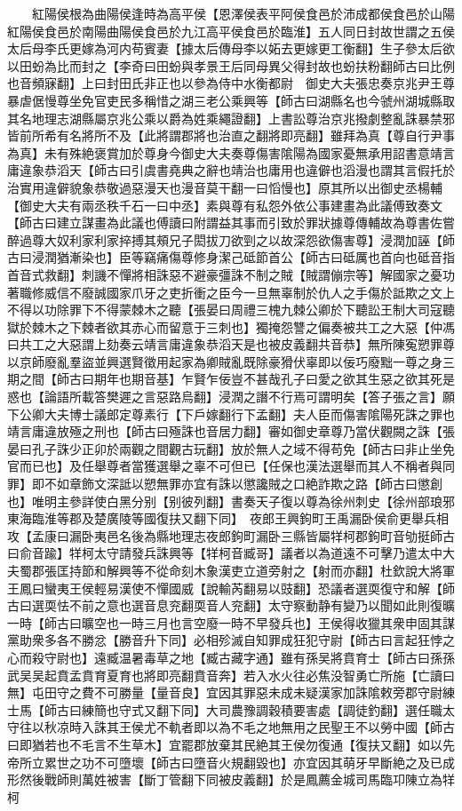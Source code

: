 　　紅陽侯根為曲陽侯逢時為高平侯【恩澤侯表平阿侯食邑於沛成都侯食邑於山陽紅陽侯食邑於南陽曲陽侯食邑於九江高平侯食邑於臨淮】五人同日封故世謂之五侯太后母李氏更嫁為河内苟賓妻【據太后傳母李以妬去更嫁更工衡翻】生子參太后欲以田蚡為比而封之【李奇曰田蚡與孝景王后同母異父得封故也蚡扶粉翻師古曰比例也音頻寐翻】上曰封田氏非正也以參為侍中水衡都尉　御史大夫張忠奏京兆尹王尊暴虐倨慢尊坐免官吏民多稱惜之湖三老公乘興等【師古曰湖縣名也今虢州湖城縣取其名地理志湖縣屬京兆公乘以爵為姓乘繩證翻】上書訟尊治京兆撥劇整亂誅暴禁邪皆前所希有名將所不及【此將謂郡將也治直之翻將即亮翻】雖拜為真【尊自行尹事為真】未有殊絶褒賞加於尊身今御史大夫奏尊傷害隂陽為國家憂無承用詔書意靖言庸違象恭滔天【師古曰引虞書堯典之辭也靖治也庸用也違僻也滔漫也謂其言假托於治實用違僻貌象恭敬過惡漫天也漫音莫干翻一曰慆慢也】原其所以出御史丞楊輔【御史大夫有兩丞秩千石一曰中丞】素與尊有私怨外依公事建畫為此議傅致奏文【師古曰建立謀畫為此議也傅讀曰附謂益其事而引致於罪狀據尊傳輔故為尊書佐嘗醉過尊大奴利家利家捽搏其頰兄子閎拔刀欲剄之以故深怨欲傷害尊】浸潤加誣【師古曰浸潤猶漸染也】臣等竊痛傷尊修身潔己砥節首公【師古曰砥厲也首向也砥音指首音式救翻】刺譏不憚將相誅惡不避豪彊誅不制之賊【賊謂傰宗等】解國家之憂功著職修威信不廢誠國家爪牙之吏折衝之臣今一旦無辜制於仇人之手傷於詆欺之文上不得以功除罪下不得蒙棘木之聽【張晏曰周禮三槐九棘公卿於下聽訟王制大司寇聽獄於棘木之下棘者欲其赤心而留意于三刺也】獨掩怨讐之偏奏被共工之大惡【仲馮曰共工之大惡謂上劾奏云靖言庸違象恭滔天是也被皮義翻共音恭】無所陳寃愬罪尊以京師廢亂羣盜並興選賢徵用起家為卿賊亂既除豪猾伏辜即以佞巧廢黜一尊之身三期之間【師古曰期年也期音基】乍賢乍佞豈不甚哉孔子曰愛之欲其生惡之欲其死是惑也【論語所載答樊遲之言惡路烏翻】浸潤之譖不行焉可謂明矣【答子張之言】願下公卿大夫博士議郎定尊素行【下戶嫁翻行下孟翻】夫人臣而傷害隂陽死誅之罪也靖言庸違放殛之刑也【師古曰殛誅也音居力翻】審如御史章尊乃當伏觀闕之誅【張晏曰孔子誅少正卯於兩觀之間觀古玩翻】放於無人之域不得苟免【師古曰非止坐免官而已也】及任舉尊者當獲選舉之辜不可但已【任保也漢法選舉而其人不稱者與同罪】即不如章飾文深詆以愬無罪亦宜有誅以懲讒賊之口絶詐欺之路【師古曰懲創也】唯明主參詳使白黑分别【别彼列翻】書奏天子復以尊為徐州刺史【徐州部琅邪東海臨淮等郡及楚廣陵等國復扶又翻下同】　夜郎王興鉤町王禹漏卧侯俞更舉兵相攻【孟康曰漏卧夷邑名後為縣地理志夜郎鉤町漏卧三縣皆屬䍧柯郡鉤町音劬挺師古曰俞音踰】䍧柯太守請發兵誅興等【䍧柯音臧哥】議者以為道遠不可擊乃遣太中大夫蜀郡張匡持節和解興等不從命刻木象漢吏立道旁射之【射而亦翻】杜欽說大將軍王鳳曰蠻夷王侯輕易漢使不憚國威【說輸芮翻易以豉翻】恐議者選耎復守和解【師古曰選耎怯不前之意也選音息兖翻耎音人兖翻】太守察動静有變乃以聞如此則復曠一時【師古曰曠空也一時三月也言空廢一時不早發兵也】王侯得收獵其衆申固其謀黨助衆多各不勝忿【勝音升下同】必相殄滅自知罪成狂犯守尉【師古曰言起狂悖之心而殺守尉也】遠臧温暑毒草之地【臧古藏字通】雖有孫吴將賁育士【師古曰孫孫武吴吴起賁孟賁育夏育也將即亮翻賁音奔】若入水火往必焦没智勇亡所施【亡讀曰無】屯田守之費不可勝量【量音良】宜因其罪惡未成未疑漢家加誅隂敕旁郡守尉練士馬【師古曰練簡也守式又翻下同】大司農豫調穀積要害處【調徒釣翻】選任職太守往以秋凉時入誅其王侯尤不軌者即以為不毛之地無用之民聖王不以勞中國【師古曰即猶若也不毛言不生草木】宜罷郡放棄其民絶其王侯勿復通【復扶又翻】如以先帝所立累世之功不可墮壞【師古曰墮音火規翻毀也】亦宜因其萌牙早斷絶之及已成形然後戰師則萬姓被害【斷丁管翻下同被皮義翻】於是鳳薦金城司馬臨卭陳立為䍧柯